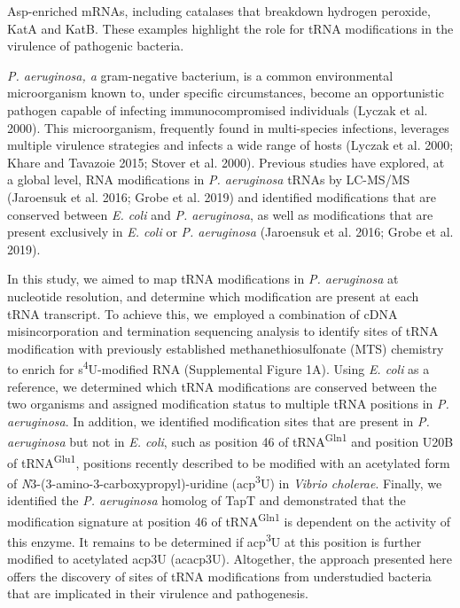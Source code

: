 \documentclass[times, twoside]{zHenriquesLab-StyleBioRxiv}
\begin{document}
Asp-enriched mRNAs, including catalases that breakdown hydrogen peroxide, KatA and KatB. These examples highlight the role for tRNA modifications in the virulence of pathogenic bacteria. 

\textit{P. aeruginosa, a }gram-negative bacterium, is a common environmental microorganism known to, under specific circumstances, become an opportunistic pathogen capable of infecting immunocompromised individuals (Lyczak et al. 2000). This microorganism, frequently found in multi-species infections, leverages multiple virulence strategies and infects a wide range of hosts (Lyczak et al. 2000; Khare and Tavazoie 2015; Stover et al. 2000). Previous studies have explored, at a global level, RNA modifications in \textit{P. aeruginosa} tRNAs by LC-MS/MS (Jaroensuk et al. 2016; Grobe et al. 2019) and identified modifications that are conserved between \textit{E. coli} and \textit{P. aeruginosa}, as well as modifications that are present exclusively in \textit{E. coli} or \textit{P. aeruginosa} (Jaroensuk et al. 2016; Grobe et al. 2019). 

In this study, we aimed to map tRNA modifications in \textit{P. aeruginosa }at nucleotide resolution, and determine which modification are present at each tRNA transcript. To achieve this, we employed a combination of cDNA misincorporation and termination sequencing analysis to identify sites of tRNA modification with previously established methanethiosulfonate (MTS) chemistry to enrich for s\textsuperscript{4}U-modified RNA (Supplemental Figure 1A). Using \textit{E. coli} as a reference, we determined which tRNA modifications are conserved between the two organisms and assigned modification status to multiple tRNA positions in \textit{P. aeruginosa}. In addition, we identified modification sites that are present in \textit{P. aeruginosa} but not in \textit{E. coli}, such as position 46 of tRNA\textsuperscript{Gln1} and position U20B of tRNA\textsuperscript{Glu1}, positions recently described to be modified with an acetylated form of \textit{N}3-(3-amino-3-carboxypropyl)-uridine (acp\textsuperscript{3}U) in \textit{Vibrio cholerae}. Finally, we identified the \textit{P. aeruginosa }homolog of TapT and demonstrated that the modification signature at position 46 of tRNA\textsuperscript{Gln1} is dependent on the activity of this enzyme. It remains to be determined if acp\textsuperscript{3}U at this position is further modified to acetylated acp3U (acacp3U). Altogether, the approach presented here offers the discovery of sites of tRNA modifications from understudied bacteria that are implicated in their virulence and pathogenesis. 
\end{document}
